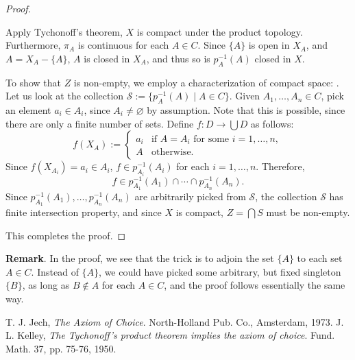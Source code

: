 \documentclass[12pt]{article}
\begin{document}
\begin{proof}
\begin{enumerate}
Apply Tychonoff's theorem, $X$ is compact under the product topology.  Furthermore, $\pi_A$ is continuous for each $A\in C$.  Since $\lbrace A\rbrace$ is open in $X_A$, and $A=X_A-\lbrace A\rbrace$, $A$ is closed in $X_A$, and thus so is $p_A^{-1}(A)$ closed in $X$.

To show that $Z$ is non-empty, we employ a characterization of compact space: .  Let us look at the collection $\mathcal{S}:=\lbrace p_A^{-1}(A)\mid A\in C\rbrace$.  Given $A_1,\ldots, A_n\in C$, pick an element $a_i\in A_i$, since $A_i\ne \varnothing$ by assumption.  Note that this is possible, since there are only a finite number of sets.  Define $f:D\to \bigcup D$ as follows: 
\begin{displaymath}
f(X_A):= \left\{
\begin{array}{ll}
a_i & \textrm{if }A=A_i\textrm{ for some }i=1,\ldots, n,\\
A & \textrm{otherwise.}
\end{array}
\right.
\end{displaymath}
Since $f(X_{A_i})=a_i \in A_i$, $f\in p_{A_i}^{-1}(A_i)$ for each $i=1,\ldots, n$.  Therefore, $$f\in p_{A_1}^{-1}(A_1) \cap \cdots \cap p_{A_n}^{-1}(A_n).$$  Since $p_{A_1}^{-1}(A_1), \ldots, p_{A_n}^{-1}(A_n)$ are arbitrarily picked from $\mathcal{S}$, the collection $\mathcal{S}$ has finite intersection property, and since $X$ is compact, $Z=\bigcap S$ must be non-empty.
\end{enumerate}
This completes the proof.
\end{proof}

\textbf{Remark}.  In the proof, we see that the trick is to adjoin the set $\lbrace A\rbrace$ to each set $A\in C$.  Instead of $\lbrace A\rbrace$, we could have picked some arbitrary, but fixed singleton $\lbrace B\rbrace$, as long as $B\notin A$ for each $A\in C$, and the proof follows essentially the same way.


\begin{thebibliography}{9}
T. J. Jech, \emph{The Axiom of Choice}. North-Holland Pub. Co., Amsterdam, 1973.
J. L. Kelley, \emph{The Tychonoff's product theorem implies the axiom of choice}. Fund. Math. 37, pp. 75-76, 1950.
\end{thebibliography}
\end{document}
